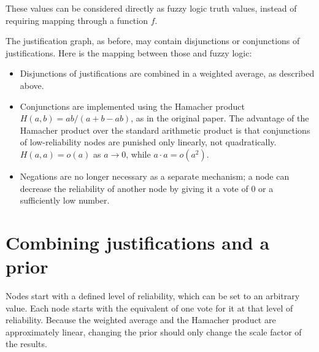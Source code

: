 \documentclass{article}
\begin{document}
These values can be considered directly as fuzzy logic truth values, instead of
requiring mapping through a function $f$.

The justification graph, as before, may contain disjunctions or conjunctions of
justifications. Here is the mapping between those and fuzzy logic:

\begin{itemize}
\item Disjunctions of justifications are combined in a weighted average, as
described above.
\item Conjunctions are implemented using the Hamacher product $H(a, b) =
ab/(a+b-ab)$, as in the original paper. The advantage of the Hamacher product
over the standard arithmetic product is that conjunctions of low-reliability
nodes are punished only linearly, not quadratically. $H(a, a) = o(a)$ as $a
\rightarrow 0$, while $a \cdot a = o(a^2)$.
\item Negations are no longer necessary as a separate mechanism; a node can decrease the reliability of another node by giving it a vote of 0 or a sufficiently low number.
\end{itemize}

\section{Combining justifications and a prior}

Nodes start with a defined level of reliability, which can be set to an
arbitrary value. Each node starts with the equivalent of one vote for it at
that level of reliability. Because the weighted average and the Hamacher
product are approximately linear, changing the prior should only change the
scale factor of the results.
\end{document}

